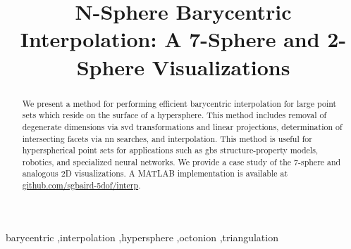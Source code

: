 \documentclass[final,12pt]{elsarticle}
\begin{document}
	
	\sloppy %
	
	\begin{frontmatter}
		
		\title{N-Sphere Barycentric Interpolation: A 7-Sphere and 2-Sphere Visualizations}
		
		
		
		\begin{abstract}
			We present a method for performing efficient barycentric interpolation for large point sets which reside on the surface of a hypersphere. This method includes removal of degenerate dimensions via \gls{svd} transformations and linear projections, determination of intersecting facets via \gls{nn} searches, and interpolation. This method is useful for hyperspherical point sets for applications such as \glspl{gb} structure-property models, robotics, and specialized neural networks. We provide a case study of the 7-sphere and analogous 2D visualizations. A MATLAB implementation is available at \url{github.com/sgbaird-5dof/interp}.
		\end{abstract}
	
	\begin{keyword}
		barycentric \sep interpolation \sep hypersphere \sep octonion \sep triangulation %
	\end{keyword}

	\end{frontmatter}
\end{document}
